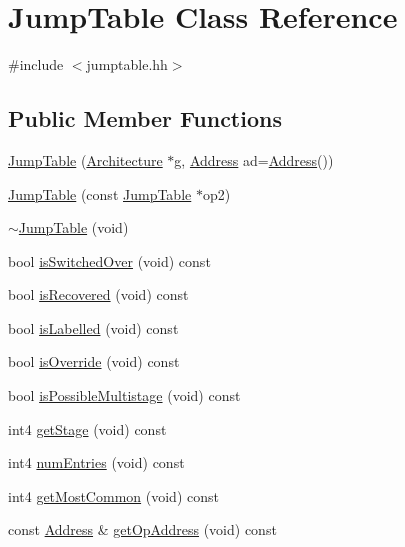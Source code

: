 \hypertarget{class_jump_table}{}\section{Jump\+Table Class Reference}
\label{class_jump_table}


{\ttfamily \#include $<$jumptable.\+hh$>$}

\subsection*{Public Member Functions}
\begin{DoxyCompactItemize}
\item 
\mbox{\hyperlink{class_jump_table_a319075559bee7b7d3ae6b0485965a14e}{Jump\+Table}} (\mbox{\hyperlink{class_architecture}{Architecture}} $\ast$g, \mbox{\hyperlink{class_address}{Address}} ad=\mbox{\hyperlink{class_address}{Address}}())
\item 
\mbox{\hyperlink{class_jump_table_a5dc7b9ca334dba4d61a615f7a016b820}{Jump\+Table}} (const \mbox{\hyperlink{class_jump_table}{Jump\+Table}} $\ast$op2)
\item 
\mbox{\hyperlink{class_jump_table_a03847c123233a3f60e923fa6ae27af88}{$\sim$\+Jump\+Table}} (void)
\item 
bool \mbox{\hyperlink{class_jump_table_a667875c89b0b8c73b76c1cb09f9917d5}{is\+Switched\+Over}} (void) const
\item 
bool \mbox{\hyperlink{class_jump_table_ab745ea6bfd38b7cdd5812d360290a570}{is\+Recovered}} (void) const
\item 
bool \mbox{\hyperlink{class_jump_table_a23d6ce09d425674cbdc41cfb082b1937}{is\+Labelled}} (void) const
\item 
bool \mbox{\hyperlink{class_jump_table_af02131615a17c9fa6ee4693c3988eb5a}{is\+Override}} (void) const
\item 
bool \mbox{\hyperlink{class_jump_table_a9550d6bef76cc325b16f7b1baa829f9b}{is\+Possible\+Multistage}} (void) const
\item 
int4 \mbox{\hyperlink{class_jump_table_a52203c6582b2b49390ba3815e1377c5a}{get\+Stage}} (void) const
\item 
int4 \mbox{\hyperlink{class_jump_table_a41c4acebed672cc4e66e6d03c35aecaa}{num\+Entries}} (void) const
\item 
int4 \mbox{\hyperlink{class_jump_table_a0c76ef1e110791cd1175ba1c6b9d5c82}{get\+Most\+Common}} (void) const
\item 
const \mbox{\hyperlink{class_address}{Address}} \& \mbox{\hyperlink{class_jump_table_a98e5d9d6c61755969ae9c32eb3013af4}{get\+Op\+Address}} (void) const

\end{DoxyCompactItemize}
